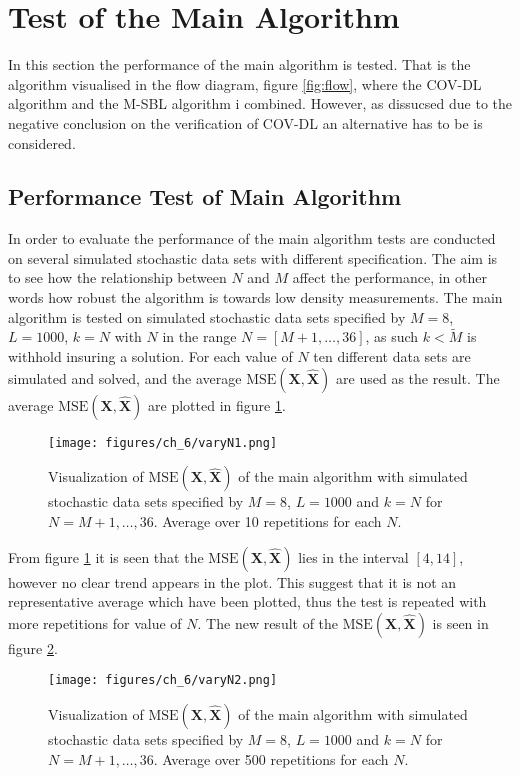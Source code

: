 \section{Test of the Main Algorithm}\label{sec:test_base}
In this section the performance of the main algorithm is tested. That is the algorithm visualised in the flow diagram, figure \ref{fig:flow}, where the COV-DL algorithm and the M-SBL algorithm i combined. However, as dissucsed due to the negative conclusion on the verification of COV-DL an alternative has to be is considered.  
 
  

\subsection{Performance Test of Main Algorithm}\label{sec:Main_test}
In order to evaluate the performance of the main algorithm tests are conducted on several simulated stochastic data sets with different specification. 
The aim is to see how the relationship between $N$ and $M$ affect the performance, in other words how robust the algorithm is towards low density measurements. 
The main algorithm is tested on simulated stochastic data sets specified by $M=8$, $L=1000$, $k=N$ with $N$ in the range $N = [M+1,\dots,36]$, as such $k<\widetilde{M}$ is withhold insuring a solution.
For each value of $N$ ten different data sets are simulated and solved, and the average $\text{MSE}(\mathbf{X}, \hat{\mathbf{X}})$ are used as the result. 
The average $\text{MSE}(\mathbf{X}, \hat{\mathbf{X}})$ are plotted in figure \ref{fig:varyN1}.
\begin{figure}[H]
    \centering
	\texttt{[image: figures/ch\_6/varyN1.png]}
	\caption{Visualization of $\text{MSE}(\mathbf{X}, \hat{\mathbf{X}})$ of the main algorithm with simulated stochastic data sets specified by $M = 8$, $L=1000$ and $k = N$ for $N = M+1, \hdots , 36$. Average over 10 repetitions for each $N$.}
	\label{fig:varyN1}
\end{figure}
\noindent
From figure \ref{fig:varyN1} it is seen that the $\text{MSE}(\mathbf{X}, \hat{\mathbf{X}})$ lies in the interval $[4,14]$, however no clear trend appears in the plot. 
This suggest that it is not an representative average which have been plotted, thus the test is repeated with more repetitions for value of $N$. The new result of the $\text{MSE}(\mathbf{X}, \hat{\mathbf{X}})$ is seen in figure \ref{fig:varyN2}.
\begin{figure}[H]
    \centering
	\texttt{[image: figures/ch\_6/varyN2.png]}
	\caption{Visualization of $\text{MSE}(\mathbf{X}, \hat{\mathbf{X}})$ of the main algorithm with simulated stochastic data sets specified by $M = 8$, $L=1000$ and $k = N$ for $N = M+1, \hdots , 36$. Average over 500 repetitions for each $N$.}
	\label{fig:varyN2}
\end{figure}  
